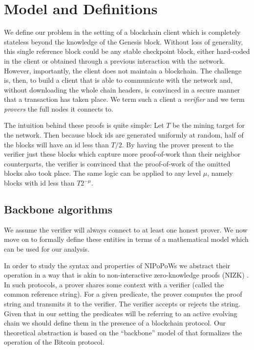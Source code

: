 \section{Model and Definitions}
\label{sec.model}

We define our problem in the setting of a blockchain client which is completely
stateless beyond the knowledge of the Genesis block. Without loss of
generality, this single reference block could be any stable checkpoint block,
either hard-coded in the client or obtained through a previous interaction with
the network. However, importantly, the client does not maintain a blockchain.
The challenge is, then, to build a client that is able to communicate with the
network and, without downloading the whole chain headers, is convinced in a
secure manner that a transaction has taken place. We term such a client a
\textit{verifier} and we term \textit{provers} the full nodes it connects to.

The intuition behind these proofs is quite simple: Let $T$ be the mining target
for the network. Then because block ids are generated uniformly at random, half
of the blocks will have an id less than $T / 2$. By having the prover present to
the verifier just these blocks which capture more proof-of-work than their
neighbor counterparts, the verifier is convinced that the proof-of-work of the
omitted blocks also took place. The same logic can be applied to any level
$\mu$, namely blocks with id less than $T 2^{-\mu}$.

\subsection{Backbone algorithms}

We assume the verifier will always connect to at least one honest prover. We
now move on to formally define these entities in terms of a mathematical model
which can be used for our analysis.

In order to study the syntax and properties of NIPoPoWs
we abstract their operation in a way that is akin to non-interactive
zero-knowledge proofs (NIZK) \cite{BFM88}. In such protocols, a prover
shares some context with a verifier (called the common reference string).
For a given predicate, the prover computes the proof string and transmits it
to the verifier. The verifier accepts or rejects the string. Given that in our
setting the predicates will be referring to an active evolving chain
we should define them in the presence of a blockchain protocol.
Our theoretical abstraction is based on  the ``backbone'' model of
\cite{backbone} that formalizes the operation of the Bitcoin protocol.


